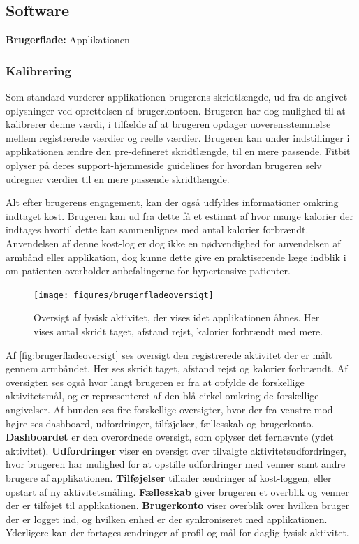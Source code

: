 \subsection{Software}
\textbf{Brugerflade:} %
Applikationen  

\subsubsection{Kalibrering}
Som standard vurderer applikationen brugerens skridtlængde, ud fra de angivet oplysninger ved oprettelsen af brugerkontoen. Brugeren har dog mulighed til at kalibrerer denne værdi, i tilfælde af at brugeren opdager uoverensstemmelse mellem registrerede værdier og reelle værdier. Brugeren kan under indstillinger i applikationen ændre den pre-defineret skridtlængde, til en mere passende. Fitbit oplyser på deres support-hjemmeside guidelines for hvordan brugeren selv udregner værdier til en mere passende skridtlængde.   

Alt efter brugerens engagement, kan der også udfyldes informationer omkring indtaget kost. Brugeren kan ud fra dette få et estimat af hvor mange kalorier der indtages hvortil dette kan sammenlignes med antal kalorier forbrændt. Anvendelsen af denne kost-log er dog ikke en nødvendighed for anvendelsen af armbånd eller applikation, dog kunne dette give en praktiserende læge indblik i om patienten overholder anbefalingerne for hypertensive patienter.  

\begin{figure}[H]
	\centering
	\texttt{[image: figures/brugerfladeoversigt]}
	\caption{Oversigt af fysisk aktivitet, der vises idet applikationen åbnes. Her vises antal skridt taget, afstand rejst, kalorier forbrændt med mere.}
	\label{fig:brugerfladeoversigt}
\end{figure}

Af \autoref{fig:brugerfladeoversigt} ses oversigt den registrerede aktivitet der er målt gennem armbåndet. Her ses skridt taget, afstand rejst og kalorier forbrændt. Af oversigten ses også hvor langt brugeren er fra at opfylde de forskellige aktivitetsmål, og er repræsenteret af den blå cirkel omkring de forskellige angivelser. 
Af bunden ses fire forskellige oversigter, hvor der fra venstre mod højre ses dashboard, udfordringer, tilføjelser, fællesskab og brugerkonto. \textbf{Dashboardet} er den overordnede oversigt, som oplyser det førnævnte (ydet aktivitet). 
\textbf{Udfordringer} viser en oversigt over tilvalgte aktivitetsudfordringer, hvor brugeren har mulighed for at opstille udfordringer med venner samt andre brugere af applikationen. 
\textbf{Tilføjelser} tillader ændringer af kost-loggen, eller opstart af ny aktivitetsmåling. 
\textbf{Fællesskab} giver brugeren et overblik og venner der er tilføjet til applikationen. 
\textbf{Brugerkonto} viser overblik over hvilken bruger der er logget ind, og hvilken enhed er der synkroniseret med applikationen. Yderligere kan der fortages ændringer af profil og mål for daglig fysisk aktivitet. 

